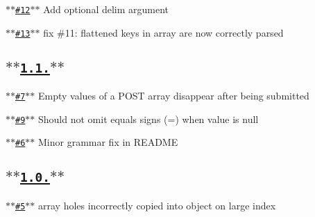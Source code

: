 \begin{DoxyItemize}
\item \href{https://github.com/hapijs/qs/issues/12}{\tt $\ast$$\ast$\#12$\ast$$\ast$} Add optional delim argument
\item \href{https://github.com/hapijs/qs/issues/13}{\tt $\ast$$\ast$\#13$\ast$$\ast$} fix \#11\+: flattened keys in array are now correctly parsed
\end{DoxyItemize}

\subsection*{\href{https://github.com/hapijs/qs/issues?milestone=3&state=closed}{\tt $\ast$$\ast$1.1.$\ast$$\ast$}}


\begin{DoxyItemize}
\item \href{https://github.com/hapijs/qs/issues/7}{\tt $\ast$$\ast$\#7$\ast$$\ast$} Empty values of a P\+O\+S\+T array disappear after being submitted
\item \href{https://github.com/hapijs/qs/issues/9}{\tt $\ast$$\ast$\#9$\ast$$\ast$} Should not omit equals signs (=) when value is null
\item \href{https://github.com/hapijs/qs/issues/6}{\tt $\ast$$\ast$\#6$\ast$$\ast$} Minor grammar fix in R\+E\+A\+D\+M\+E
\end{DoxyItemize}

\subsection*{\href{https://github.com/hapijs/qs/issues?milestone=2&state=closed}{\tt $\ast$$\ast$1.0.$\ast$$\ast$}}


\begin{DoxyItemize}
\item \href{https://github.com/hapijs/qs/issues/5}{\tt $\ast$$\ast$\#5$\ast$$\ast$} array holes incorrectly copied into object on large index 
\end{DoxyItemize}